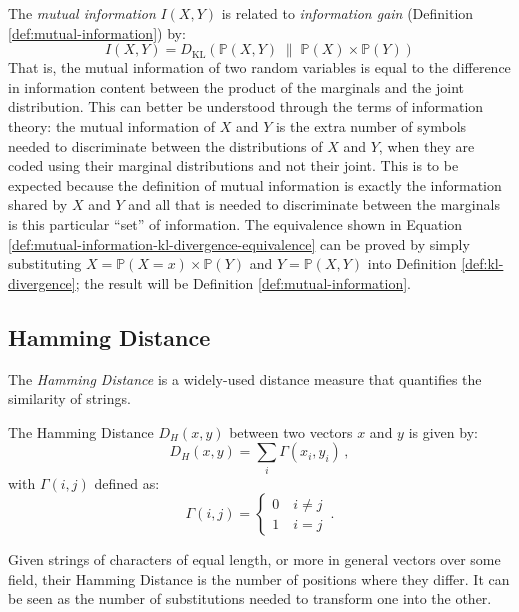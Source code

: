 The \textit{mutual information} $I(X,Y)$ is related to \textit{information gain} (Definition \ref{def:mutual-information}) by:
\begin{equation} \label{def:mutual-information-kl-divergence-equivalence}
	I(X,Y) = D_{\mathrm{KL}}(\mathbb{P}(X,Y) \; \| \; \mathbb{P}(X) \times \mathbb{P}(Y) )
\end{equation}
That is, the mutual information of two random variables is equal to the difference in information content between the product of the marginals and the joint distribution.
This can better be understood through the terms of information theory: the mutual information of $X$ and $Y$ is the extra number of symbols needed to discriminate between the distributions of $X$ and $Y$, when they are coded using their marginal distributions and not their joint.
This is to be expected because the definition of mutual information is exactly the information shared by $X$ and $Y$ and all that is needed to discriminate between the marginals is this particular \enquote{set} of information.
The equivalence shown in Equation \ref{def:mutual-information-kl-divergence-equivalence} can be proved by simply substituting $X=\mathbb{P}(X=x) \times \mathbb{P}(Y)$ and $Y=\mathbb{P}(X,Y)$ into Definition \ref{def:kl-divergence}; the result will be Definition \ref{def:mutual-information}.

\subsection{Hamming Distance} \label{subsec:hamming-distance}
The \textit{Hamming Distance} is a widely-used distance measure that quantifies the similarity of strings.
\begin{definition} \label{def:hamming}
	The Hamming Distance $D_H(x,y)$ between two vectors $x$ and $y$ is given by:
	\begin{equation}
		D_H(x,y) = \sum\limits_i \Gamma(x_i, y_i) \,,
	\end{equation}
	with $\Gamma(i,j)$ defined as:
	\begin{equation}
		\Gamma(i,j) = 
		\begin{cases}
			0 \quad i \neq j \\
			1 \quad i = j	
		\end{cases} \,.
	\end{equation}
\end{definition}
Given strings of characters of equal length, or more in general vectors over some field, their Hamming Distance is the number of positions where they differ.
It can be seen as the number of substitutions needed to transform one into the other.

